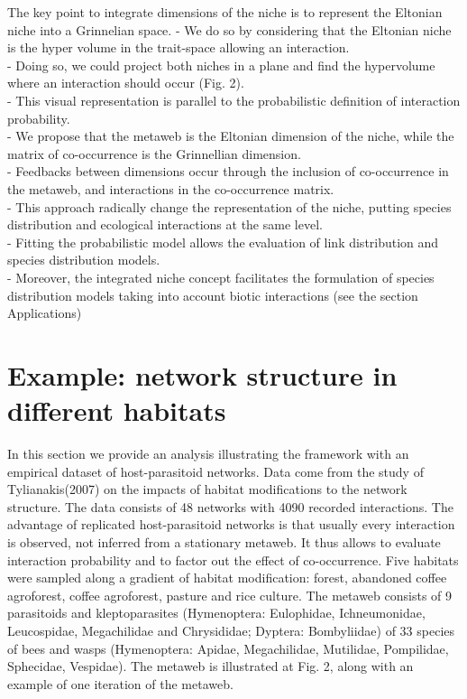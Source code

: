 \documentclass[12pt]{article}
\begin{document}
The key point to integrate dimensions of the niche is to represent the Eltonian niche into a Grinnelian space. 
- We do so by considering that the Eltonian niche is the hyper volume in the trait-space allowing an interaction. \\
- Doing so, we could project both niches in a plane and find the hypervolume where an interaction should occur (Fig. 2). \\
- This visual representation is parallel to the probabilistic definition of interaction probability. \\
- We propose that the metaweb is the Eltonian dimension of the niche, while the matrix of co-occurrence is the Grinnellian dimension. \\
- Feedbacks between dimensions occur through the inclusion of co-occurrence in the metaweb, and interactions in the co-occurrence matrix. \\
- This approach radically change the representation of the niche, putting species distribution and ecological interactions at the same level. \\
- Fitting the probabilistic model allows the evaluation of link distribution and species distribution models. \\
- Moreover, the integrated niche concept facilitates the formulation of species distribution models taking into account biotic interactions (see the section Applications) \\


\newpage
\section*{Example: network structure in different habitats}

In this section we provide an analysis illustrating the framework with an
empirical dataset of host-parasitoid networks. Data come from the study of
Tylianakis(2007) on the impacts of habitat modifications to the network
structure. The data consists of 48 networks with 4090 recorded interactions. The
advantage of replicated host-parasitoid networks is that usually every
interaction is observed, not inferred from a stationary metaweb. It thus allows
to evaluate interaction probability and to factor out the effect of
co-occurrence. Five habitats were sampled along a gradient of habitat
modification: forest, abandoned coffee agroforest, coffee agroforest, pasture
and rice culture. The metaweb consists of 9 parasitoids and kleptoparasites
(Hymenoptera: Eulophidae, Ichneumonidae, Leucospidae, Megachilidae and
Chrysididae; Dyptera: Bombyliidae) of 33 species of bees and wasps (Hymenoptera:
Apidae, Megachilidae, Mutilidae, Pompilidae, Sphecidae, Vespidae). The metaweb
is illustrated at Fig. 2, along with an example of one iteration of the metaweb.
\end{document}
